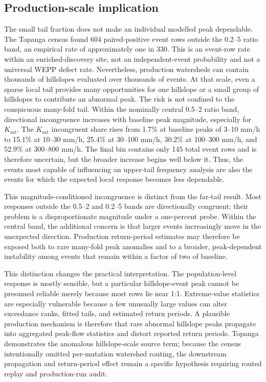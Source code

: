 \documentclass[11pt]{article}
\newcommand{\Ksat}{\ensuremath{K_{\mathrm{sat}}}}
\begin{document}
\subsection{Production-scale implication}

The small tail fraction does not make an individual modelled peak dependable.
The Topanga census found 604 paired-positive event rows outside the 0.2--5
ratio band, an empirical rate of approximately one in 330. This is an
event-row rate within an enriched-discovery site, not an independent-event
probability and not a universal WEPP defect rate. Nevertheless, production
watersheds can contain thousands of hillslopes evaluated over thousands of
events. At that scale, even a sparse local tail provides many opportunities
for one hillslope or a small group of hillslopes to contribute an abnormal
peak. The risk is not confined to the conspicuous many-fold tail. Within the
nominally central 0.5--2 ratio band, directional incongruence increases with
baseline peak magnitude, especially for \Ksat{}. The \Ksat{} incongruent share
rises from 1.7\% at baseline peaks of 3--10 mm/h to 15.1\% at 10--30 mm/h,
25.4\% at 30--100 mm/h, 30.2\% at 100--300 mm/h, and 52.9\% at
300--800 mm/h. The final bin contains only 145 total event rows and is
therefore uncertain, but the broader increase begins well below it. Thus, the
events most capable of influencing an upper-tail frequency analysis are also
the events for which the expected local response becomes less dependable.

This magnitude-conditioned incongruence is distinct from the far-tail result.
Most responses outside the 0.5--2 and 0.2--5 bands are directionally
congruent; their problem is a disproportionate magnitude under a one-percent
probe. Within the central band, the additional concern is that larger events
increasingly move in the unexpected direction. Production return-period
estimates may therefore be exposed both to rare many-fold peak anomalies and
to a broader, peak-dependent instability among events that remain within a
factor of two of baseline.

This distinction changes the practical interpretation. The population-level
response is mostly sensible, but a particular hillslope-event peak cannot be
presumed reliable merely because most rows lie near 1:1. Extreme-value
statistics are especially vulnerable because a few unusually large values can
alter exceedance ranks, fitted tails, and estimated return periods. A plausible
production mechanism is therefore that rare abnormal hillslope peaks propagate
into aggregated peak-flow statistics and distort reported return periods.
Topanga demonstrates the anomalous hillslope-scale source term; because the
census intentionally omitted per-mutation watershed routing, the downstream
propagation and return-period effect remain a specific hypothesis requiring
routed replay and production-run audit.
\end{document}
